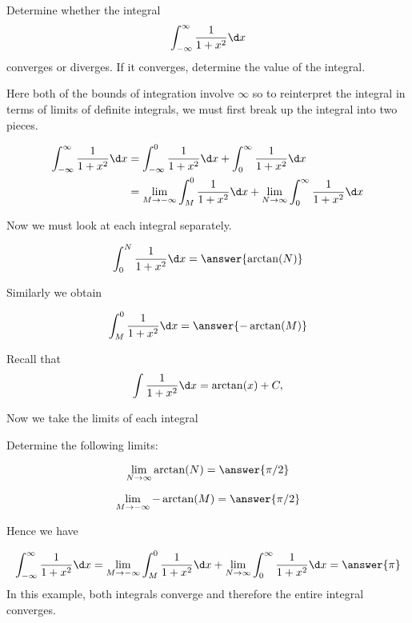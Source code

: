 \documentclass{ximera}
\begin{document}
\begin{example}
Determine whether the integral
\[
\int_{-\infty}^{\infty} \frac{1}{1+x^{2}} \d x 
\]
converges or diverges. If it converges, determine the value of the integral. 
\begin{explanation}
Here both of the bounds of integration involve $\infty$ so to reinterpret the integral in terms of limits of definite integrals, 
we must first break up the integral into two pieces.

\begin{align*}
\int_{-\infty}^{\infty} \frac{1}{1+x^{2}} \d x&= \int_{-\infty}^{0} \frac{1}{1+x^{2}} \d x + \int_{0}^{\infty} \frac{1}{1+x^{2}} \d x \\
& =\lim_{M \to -\infty} \int_{M}^{0} \frac{1}{1+x^{2}} \d x + \lim_{N \to \infty} \int_{0}^{\infty} \frac{1}{1+x^{2}} \d x 
\end{align*}
 
Now we must look at each integral separately. 

\[
\int_{0}^{N} \frac{1}{1+x^2} \d x =  \answer{\arctan(N)}
\]


Similarly we obtain

\[
\int_{M}^{0} \frac{1}{1+x^{2}} \d x= \answer{-\arctan(M)}
\]
 
\begin{hint}
Recall that 
  \[
  \int \frac{1}{1+x^2} \d x = \arctan(x)+C,
  \]
  \end{hint}

Now we take the limits of each integral

\begin{question}
Determine the following limits:

 \begin{prompt}
   \[
    \lim_{N\to\infty} \arctan(N) = \answer{\pi/2}
    \]

\[
\lim_{M \to -\infty} -\arctan(M)=\answer{\pi/2}
\]
  \end{prompt}
\end{question}

Hence we have

\[
\int_{-\infty}^{\infty} \frac{1}{1+x^{2}} \d x=\lim_{M \to -\infty} \int_{M}^{0} \frac{1}{1+x^{2}} \d x + \lim_{N \to \infty} \int_{0}^{\infty} \frac{1}{1+x^{2}} \d x =\answer{ \pi}
\]
In this example, both integrals converge and therefore the entire integral converges. 
\end{explanation}
\end{example}
\end{document}
